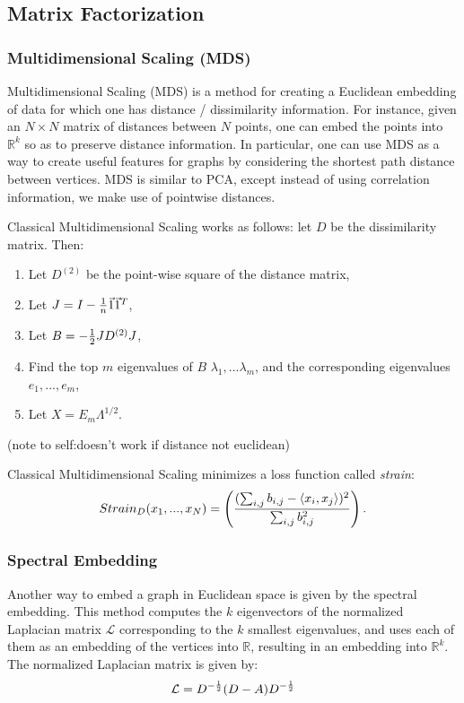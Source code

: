 \subsection{Matrix Factorization}
\subsubsection*{Multidimensional Scaling (MDS)}
Multidimensional Scaling (MDS) is a method for creating a Euclidean embedding of data for which one has distance / dissimilarity information. For instance, given an $N \times N$ matrix of distances between $N$ points, one can embed the points into $\mathbb{R}^k$ so as to preserve distance information. In particular, one can use MDS as a way to create useful features for graphs by considering the shortest path distance between vertices. MDS is similar to PCA, except instead of using correlation information, we make use of pointwise distances.

Classical Multidimensional Scaling works as follows: let $D$ be the dissimilarity matrix. Then:
\begin{enumerate}
  \item Let $D^{(2)}$ be the point-wise square of the distance matrix,
  \item Let $J = I - {1\over n}\vec{1}\vec{1}^T$,
  \item Let $B = -{1 \over 2}JD^{(2)}J$,
  \item Find the top $m$ eigenvalues of $B$ $\lambda_1, ... \lambda_m$, and the corresponding eigenvalues $e_1, ... , e_m$,
  \item Let $X = E_m\Lambda^{1/2}$.
\end{enumerate}
(note to  self:doesn't work if distance not euclidean)


Classical Multidimensional Scaling minimizes a loss function called \emph{strain}:
\[
    Strain_D(x_1, ... , x_N) = \left( ({\sum_{i,j}b_{i,j}- \langle x_i,x_j \rangle})^2 \over \sum_{i,j}b_{i,j}^2\right).
\]

\subsubsection*{Spectral Embedding}
Another way to embed a graph in Euclidean space is given by the spectral embedding. This method computes the $k$ eigenvectors of the normalized Laplacian matrix $\mathcal{L}$  corresponding to the $k$ smallest eigenvalues, and uses each of them as an embedding of the  vertices into $\mathbb{R}$, resulting in an  embedding into $\mathbb{R}^k$. The normalized Laplacian matrix is given by:
\[
    \mathcal{L} = D^{-{1\over 2}}(D - A)D^{-{1\over 2}}
\]

